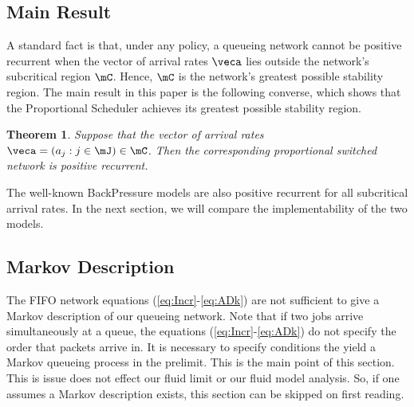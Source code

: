 \documentclass{amsart}
\newtheorem{theorem}{Theorem}
\begin{document}
\subsection{Main Result}
A standard fact is that, under any policy, a queueing network cannot be positive recurrent when the vector of arrival rates $\veca$ lies outside the network's subcritical region $\mC$.  Hence,
$\mC$ is the network's greatest possible stability region.
The main result in this paper is the following converse, which shows that the Proportional Scheduler achieves its greatest possible stability region.

\begin{theorem}\label{mainthrm}
Suppose that the vector of arrival rates $\veca = (a_j : j\in\mJ) \in \mC$.  Then the corresponding proportional switched network is positive recurrent.
\end{theorem}

The well-known BackPressure models are also positive recurrent for all subcritical arrival rates.
In the next section, we will compare the implementability of the two models.

\iffalse
The processes $\Gamma$, $A$ and $D$, indexed by $k\in\mK$, are sufficient to maintain a FIFO order of service at the queue. From the definitions of $\Gamma$, $A$ and $D$, the following conditions are ensured by FIFO order of service: for $k \in j$ and $t_2 \geq t_1$,
\begin{subequations}\label{eq:A.and.D.deriv}
\begin{align}
A_k(t_2) - A_k(t_1)= \Gamma_k(A_j(t_2)) - \Gamma_k(A_j(t_1)),\\
D_k(t_2) - D_k(t_1)= \Gamma_k(D_j(t_2)) - \Gamma_k(D_j(t_1)),
\end{align}
\end{subequations}
We can then define the state of class $k \in j$ packets at time $t$ with the vector
\begin{equation}
X_k(t)= ( \Gamma_k(s) : s=D_j(t), D_j(t)+1, ..., A_j(t)).
\end{equation}
From this we can define the state of the FIFO queueing networks by
\begin{equation} \label{eq:state.vec}
  X(t)=(X_k(t) :  k \in \mK) \ .
\end{equation}
\fi

\iffalse
\subsection{Markov Description}
The FIFO network equations (\ref{eq:Incr}-\ref{eq:ADk}) are not sufficient to give a Markov description of our queueing network. Note that if two jobs arrive simultaneously at a queue, the equations (\ref{eq:Incr}-\ref{eq:ADk}) do not specify the order that packets arrive in.
It is necessary to specify conditions the yield a Markov queueing process in the prelimit. This is the main point of this section. This is issue does not effect our fluid limit or our fluid model analysis. So, if one assumes a Markov description exists, this section can be skipped on first reading.
\end{document}
